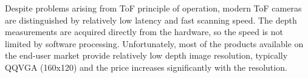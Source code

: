 Despite problems arising from ToF principle of operation, modern ToF cameras are distinguished by relatively low latency and fast scanning speed. The depth measurements are acquired directly from the hardware, so the speed is not limited by software processing. Unfortunately, most of the products available on the end-user market provide relatively low depth image resolution, typically QQVGA (160x120) and the price increases significantly with the resolution.

